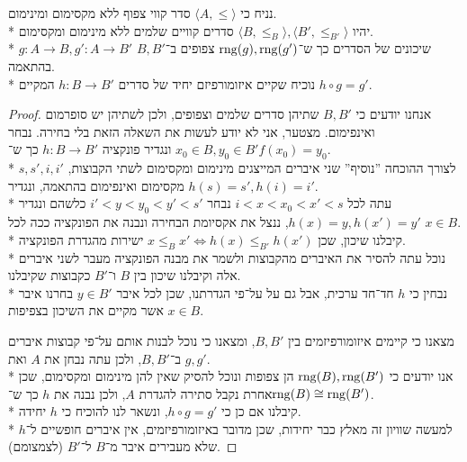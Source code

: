 \Question{}
נניח כי $\langle A, \le \rangle$ סדר קווי צפוף ללא מקסימום ומינימום. \\*
יהיו $\langle B, \le_B \rangle, \langle B', \le_{B'} \rangle$ סדרים קוויים שלמים ללא מינימום ומקסימום. \\*
$g : A \to B, g' : A \to B'$ שיכונים של הסדרים כך ש־$\operatorname{rng}(g), \operatorname{rng}(g')$ צפופים ב־$B, B'$ בהתאמה. \\*
נוכיח שקיים איזומורפיזם יחיד של סדרים $h : B \to B'$ המקיים $h \circ g = g'$.
\begin{proof}
	אנחנו יודעים כי $B, B'$ שתיהן סדרים שלמים וצפופים, ולכן לשתיהן יש סופרמום ואינפימום.
	מצטער, אני לא יודע לעשות את השאלה הזאת בלי בחירה.
	נבחר $x_0 \in B, y_0 \in B'$ ונגדיר פונקציה $h : B \to B'$ כך ש־$f(x_0) = y_0$. \\*
	לצורך ההוכחה ''נוסיף'' שני איברים המייצגים מינימום ומקסימום לשתי הקבוצות, $s, s', i, i'$ מקסימום ואינפימום בהתאמה, ונגדיר $h(s) = s', h(i) = i'$. \\*
	עתה לכל $i < x < x_0 < x' < s$ נבחר $i' < y < y_0 < y' < s'$ כלשהם ונגדיר $h(x) = y, h(x') = y'$, ננצל את אקסיומת הבחירה ונבנה את הפונקציה ככה לכל $x \in B$. \\*
	קיבלנו שיכון, שכן $x \le_B x' \iff h(x) \le_{B'} h(x')$ ישירות מהגדרת הפונקציה. \\*
	נוכל עתה להסיר את האיברים מהקבוצות ולשמר את מבנה הפונקציה מעבר לשני איברים אלה וקיבלנו שיכון בין $B$ ו־$B'$ כקבוצות שקיבלנו. \\*
	נבחין כי $h$ חד־חד ערכית, אבל גם על על־פי הגדרתנו, שכן לכל איבר $y \in B'$ בחרנו איבר $x \in B$ אשר מקיים את השיכון בצפיפות.

	מצאנו כי קיימים איזומורפיזמים בין $B, B'$, ומצאנו כי נוכל לבנות אותם על־פי קבוצות איברים ב־$B, B'$, ולכן עתה נבחן את $A$ ואת $g, g'$. \\*
	אנו יודעים כי $\operatorname{rng}(B), \operatorname{rng}(B')$ הן צפופות ונוכל להסיק שאין להן מינימום ומקסימום, שכן אחרת נקבל סתירה להגדרת $A$, ולכן נבנה את $h$ כך ש־$\operatorname{rng}(B) \cong \operatorname{rng}(B')$. \\*
	קיבלנו אם כן כי $h \circ g = g'$, ונשאר לנו להוכיח כי $h$ יחידה. \\*
	למעשה שוויון זה מאלץ כבר יחידות, שכן מדובר באיזומורפיזמים, אין איברים חופשיים ל־$h$ שלא מעבירים איבר מ־$B$ ל־$B'$ (לצמצומם).
\end{proof}


